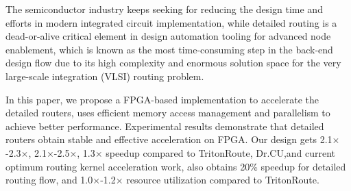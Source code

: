 
The semiconductor industry keeps seeking for reducing the design time and efforts in modern integrated circuit implementation, 
while detailed routing is a dead-or-alive critical element in design automation tooling for advanced node enablement, 
which is known as the most time-consuming step in the back-end design flow due to its high complexity and enormous solution space for the very large-scale integration (VLSI) routing problem.

In this paper, we propose a FPGA-based implementation to accelerate the detailed routers, uses efficient memory access management and parallelism to achieve better performance.
Experimental results demonstrate that detailed routers obtain stable and effective acceleration on FPGA. 
Our design gets 2.1$\times$-2.3$\times$, 2.1$\times$-2.5$\times$, 1.3$\times$ speedup compared to TritonRoute, Dr.CU,and current optimum routing kernel acceleration work, 
also obtains 20\% speedup for  detailed routing flow, and 1.0$\times$-1.2$\times$ resource utilization compared to TritonRoute.

